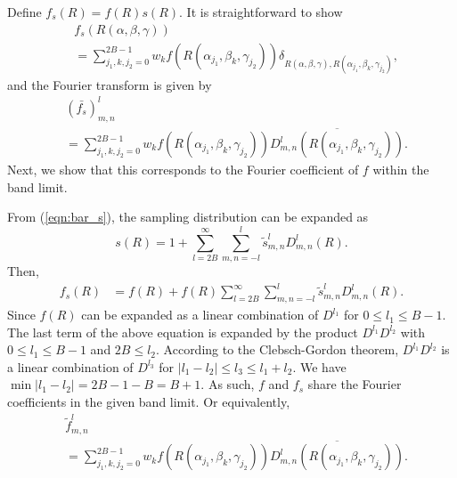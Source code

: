 \documentclass[onecolumn,11pt]{IEEEtran}
\newcommand{\refeqn}[1]{(\ref{eqn:#1})}
\begin{document}
Define $f_s(R)=f(R) s(R)$. 
It is straightforward to show
\begin{align*}
&f_s(R(\alpha,\beta,\gamma))\\
& = 
\sum_{j_1,k,j_2=0}^{2B-1} w_k f(R(\alpha_{j_1},\beta_k,\gamma_{j_2})) 
\delta_{R(\alpha,\beta,\gamma),R(\alpha_{j_1},\beta_k,\gamma_{j_2})},
\end{align*}
and the Fourier transform is given by
\begin{align*}
&(\bar{f_s})^l_{m,n}\\
& = 
\sum_{j_1,k,j_2=0}^{2B-1} w_k f(R(\alpha_{j_1},\beta_k,\gamma_{j_2})) 
\overline{D^l_{m,n}(R(\alpha_{j_1},\beta_k,\gamma_{j_2}))}.
\end{align*}
Next, we show that this corresponds to the Fourier coefficient of $f$ within the band limit. 

From \refeqn{bar_s}, the sampling distribution can be expanded as
\[
s(R)=1+\sum_{l=2B}^\infty \sum_{m,n=-l}^l \tilde s^l_{m,n} D^l_{m,n}(R).
\]
Then,
\begin{align*}
f_s(R)&=f(R)+f(R)\sum_{l=2B}^\infty \sum_{m,n=-l}^l \tilde s^l_{m,n} D^l_{m,n}(R).
\end{align*}
Since $f(R)$ can be expanded as a linear combination of $D^{l_1}$ for $0\leq l_1 \leq B-1$. 
The last term of the above equation is expanded by the product $D^{l_1}D^{l_2}$ with $0\leq l_1 \leq B-1$  and $2B\leq l_2$. 
According to the Clebsch-Gordon theorem, $D^{l_1}D^{l_2}$ is a linear combination of $D^{l_3}$ for $|l_1-l_2|\leq l_3 \leq l_1+l_2$. 
We have $\min|l_1-l_2|=2B-1-B=B+1$. 
As such, $f$ and $f_s$ share the Fourier coefficients in the given band limit. 
Or equivalently, 
\begin{align}
&\tilde f^l_{m,n}\nonumber\\
& = 
\sum_{j_1,k,j_2=0}^{2B-1} w_k f(R(\alpha_{j_1},\beta_k,\gamma_{j_2})) 
\overline{D^l_{m,n}(R(\alpha_{j_1},\beta_k,\gamma_{j_2}))}.
\end{align}
\end{document}
